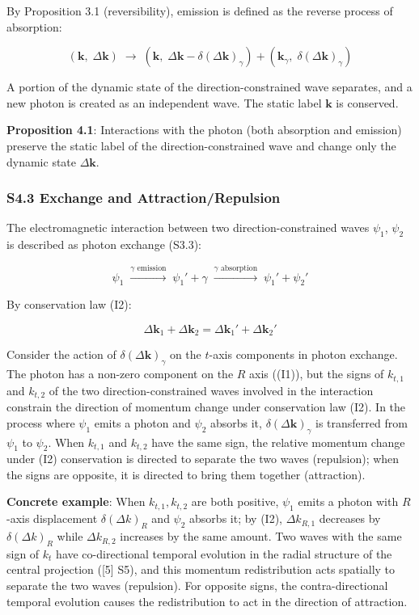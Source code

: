 \documentclass[
  a4paper,11pt]{article}
\theoremstyle{definition}
\theoremstyle{remark}
\begin{document}
By Proposition 3.1 (reversibility), emission is defined as the reverse
process of absorption:

\[(\mathbf{k},\; \Delta\mathbf{k}) \;\longrightarrow\; (\mathbf{k},\; \Delta\mathbf{k} - \delta(\Delta\mathbf{k})_\gamma) + (\mathbf{k}_\gamma,\; \delta(\Delta\mathbf{k})_\gamma)\]

A portion of the dynamic state of the direction-constrained wave
separates, and a new photon is created as an independent wave. The
static label \(\mathbf{k}\) is conserved.

\textbf{Proposition 4.1}: Interactions with the photon (both absorption
and emission) preserve the static label of the direction-constrained
wave and change only the dynamic state \(\Delta\mathbf{k}\).

\subsubsection{S4.3 Exchange and
Attraction/Repulsion}\label{s4.3-exchange-and-attractionrepulsion}

The electromagnetic interaction between two direction-constrained waves
\(\psi_1\), \(\psi_2\) is described as photon exchange (S3.3):

\[\psi_1 \;\xrightarrow{\gamma\text{ emission}}\; \psi_1' + \gamma \;\xrightarrow{\gamma\text{ absorption}}\; \psi_1' + \psi_2'\]

By conservation law (I2):

\[\Delta\mathbf{k}_1 + \Delta\mathbf{k}_2 = \Delta\mathbf{k}_1' + \Delta\mathbf{k}_2'\]

Consider the action of \(\delta(\Delta\mathbf{k})_\gamma\) on the
\(t\)-axis components in photon exchange. The photon has a non-zero
component on the \(R\) axis ((I1)), but the signs of \(k_{t,1}\) and
\(k_{t,2}\) of the two direction-constrained waves involved in the
interaction constrain the direction of momentum change under
conservation law (I2). In the process where \(\psi_1\) emits a photon
and \(\psi_2\) absorbs it, \(\delta(\Delta\mathbf{k})_\gamma\) is
transferred from \(\psi_1\) to \(\psi_2\). When \(k_{t,1}\) and
\(k_{t,2}\) have the same sign, the relative momentum change under (I2)
conservation is directed to separate the two waves (repulsion); when the
signs are opposite, it is directed to bring them together (attraction).

\textbf{Concrete example}: When \(k_{t,1}, k_{t,2}\) are both positive,
\(\psi_1\) emits a photon with \(R\)-axis displacement
\(\delta(\Delta k)_R\) and \(\psi_2\) absorbs it; by (I2),
\(\Delta k_{R,1}\) decreases by \(\delta(\Delta k)_R\) while
\(\Delta k_{R,2}\) increases by the same amount. Two waves with the same
sign of \(k_t\) have co-directional temporal evolution in the radial
structure of the central projection ({[}5{]} S5), and this momentum
redistribution acts spatially to separate the two waves (repulsion). For
opposite signs, the contra-directional temporal evolution causes the
redistribution to act in the direction of attraction.
\end{document}
